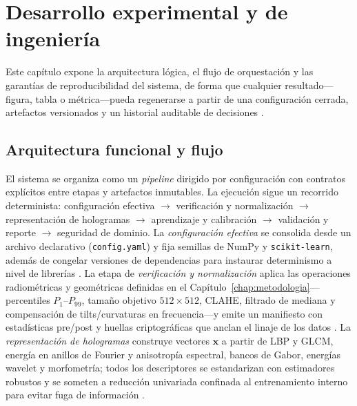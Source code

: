 \chapter{Desarrollo experimental y de ingeniería}\label{chap:desarrollo}
Este capítulo expone la arquitectura lógica, el flujo de orquestación y las garantías de reproducibilidad del sistema, de forma que cualquier resultado—figura, tabla o métrica—pueda regenerarse a partir de una configuración cerrada, artefactos versionados y un historial auditable de decisiones \cite{Tsamardinos2022,Vabalas2019,EAFIT2018}.

\section{Arquitectura funcional y flujo}
El sistema se organiza como un \textit{pipeline} dirigido por configuración con contratos explícitos entre etapas y artefactos inmutables. La ejecución sigue un recorrido determinista: configuración efectiva \(\rightarrow\) verificación y normalización \(\rightarrow\) representación de hologramas \(\rightarrow\) aprendizaje y calibración \(\rightarrow\) validación y reporte \(\rightarrow\) seguridad de dominio. La \emph{configuración efectiva} se consolida desde un archivo declarativo (\texttt{config.yaml}) y fija semillas de NumPy y \texttt{scikit-learn}, además de congelar versiones de dependencias para instaurar determinismo a nivel de librerías \cite{Pedregosa2011}. La etapa de \emph{verificación y normalización} aplica las operaciones radiométricas y geométricas definidas en el Capítulo~\ref{chap:metodologia}—percentiles \(P_{1}\)–\(P_{99}\), tamaño objetivo \(512\times512\), CLAHE, filtrado de mediana y compensación de tilts/curvaturas en frecuencia—y emite un manifiesto con estadísticas pre/post y huellas criptográficas que anclan el linaje de los datos \cite{Greenbaum2014,Amann2019,OConnor2020,Singh2017}. La \emph{representación de hologramas} construye vectores \(\mathbf{x}\) a partir de LBP y GLCM, energía en anillos de Fourier y anisotropía espectral, bancos de Gabor, energías wavelet y morfometría; todos los descriptores se estandarizan con estimadores robustos y se someten a reducción univariada confinada al entrenamiento interno para evitar fuga de información \cite{Tsamardinos2022,Vabalas2019}.

